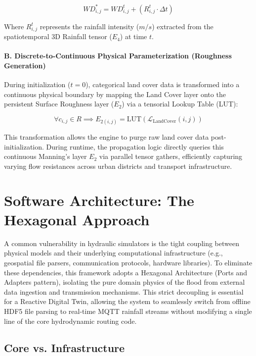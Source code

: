 $$WD_{i,j}^{*} = WD_{i,j}^{t} + \left( R_{i,j}^{t} \cdot \Delta t \right)$$

Where $R_{i,j}^{t}$ represents the rainfall intensity ($m/s$) extracted from the spatiotemporal 3D Rainfall tensor ($E_4$) at time $t$.

\paragraph{B. Discrete-to-Continuous Physical Parameterization (Roughness Generation)}

During initialization ($t=0$), categorical land cover data is transformed into a continuous physical boundary by mapping the Land Cover layer onto the persistent Surface Roughness layer ($E_2$) via a tensorial Lookup Table (LUT):

$$\forall c_{i,j} \in R \implies E_{2(i,j)} = \text{LUT}\left(\mathcal{L}_{\text{LandCover}}(i,j)\right)$$

This transformation allows the engine to purge raw land cover data post-initialization. During runtime, the propagation logic directly queries this continuous Manning's layer $E_2$ via parallel tensor gathers, efficiently capturing varying flow resistances across urban districts and transport infrastructure.



\section{Software Architecture: The Hexagonal Approach}
\label{sec:hexagonal-methodology}

A common vulnerability in hydraulic simulators is the tight coupling between physical models and their underlying computational infrastructure (e.g., geospatial file parsers, communication protocols, hardware libraries). To eliminate these dependencies, this framework adopts a Hexagonal Architecture (Ports and Adapters pattern), isolating the pure domain physics of the flood from external data ingestion and transmission mechanisms. This strict decoupling is essential for a Reactive Digital Twin, allowing the system to seamlessly switch from offline HDF5 file parsing to real-time MQTT rainfall streams without modifying a single line of the core hydrodynamic routing code.

\subsection{Core vs. Infrastructure}

